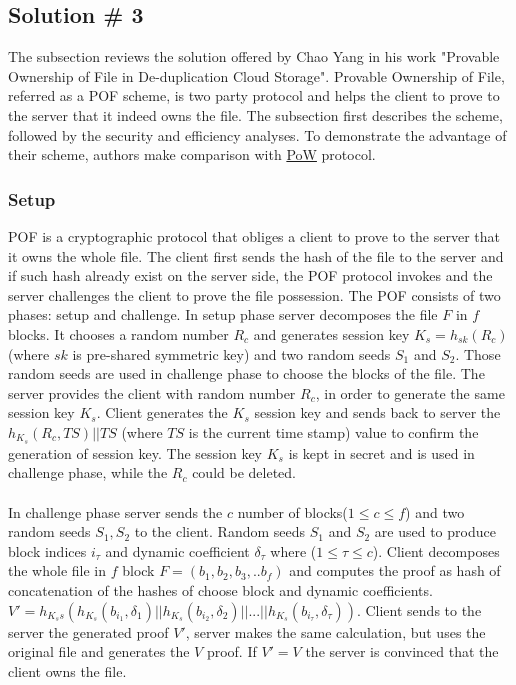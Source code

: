 \documentclass[12pt]{article}
\begin{document}
\subsection{Solution \# 3}
\label{sub:Soltuion3}
The subsection reviews the solution offered by Chao Yang in his work "Provable Ownership of File in De-duplication Cloud Storage".\cite{POF} Provable Ownership of File, referred as a POF scheme, is two party protocol and helps the client to prove to the server that it indeed owns the file. The subsection first describes the scheme, followed by the security and efficiency analyses. To demonstrate the  advantage of their scheme,  authors make comparison with \hyperref[sub:Soltuion1]{PoW} protocol.

\subsubsection{Setup}
\label{subsub:setup3}

POF is a cryptographic protocol that obliges a client to prove to the server that it owns the whole file. The client first sends the hash of the file to the server and if such hash already exist on the server side, the POF protocol invokes and the server challenges the client to prove the file possession. The POF consists of two phases: setup and challenge. In setup phase server decomposes the file $F$ in $f$ blocks. It chooses a random number  $R_c$  and generates session key $K_s = h_{sk}(R_c)$ (where $sk$ is pre-shared symmetric key) and two random seeds $S_1$ and $S_2$. Those random seeds are used in challenge phase to choose the blocks of the  file. The server provides the client with random number $R_c$, in order to generate the same session key $K_s$. Client generates the $K_s$ session key and  sends back to server the $h_{K_s}(R_c, TS)||TS$ (where $TS$ is the current time stamp) value to confirm the generation of session key.  The session key $K_s$ is kept in secret and is used in challenge phase, while the $R_c$ could be deleted.\\\\
In challenge phase server sends the $c$ number of blocks($1 \leqslant c \leqslant f $) and two random seeds $S_1,S_2$ to the client. Random seeds $S_1$ and $S_2$ are used to produce block indices $i_\tau$ and dynamic coefficient $\delta_\tau$  where ($1 \leqslant \tau \leqslant c$). Client decomposes the whole  file in $f$ block $F=(b_1,b_2,b_3,..b_f)$ and computes the proof as hash of concatenation of the hashes of choose block and dynamic coefficients.  $V' = h_{K_ss}(h_{K_s}(b_{i_1},\delta_1)||h_{K_s}(b_{i_2},\delta_2)|| ...||h_{K_s}(b_{i_\tau},\delta_\tau))$. Client sends to the server the generated proof $V'$, server makes the same calculation, but uses the original file and generates the $V$ proof. If $V'=V$ the server is convinced that the client  owns the file. 
 
\end{document}
